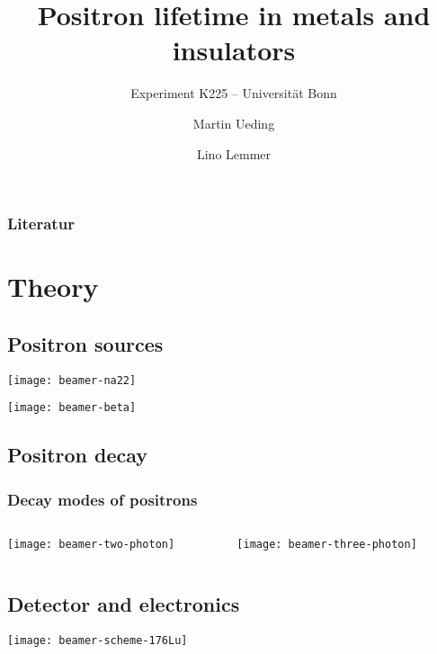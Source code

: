 \documentclass[english, fleqn]{beamer}
\title{Positron lifetime in metals and insulators}
\subtitle{Experiment K225 -- Universität Bonn}
\author{%
    Martin Ueding
    \and
    Lino Lemmer
}
\date{\daterange{2016-03-24}{2016-03-25}}
\begin{document}
\begin{frame}
    \titlepage
\end{frame}

\begin{frame}
    \frametitle{Literatur}

    \printbibliography
\end{frame}

\section{Theory}

\subsection{Positron sources}

\begin{frame}
\texttt{[image: beamer-na22]}
\end{frame}

\begin{frame}
\texttt{[image: beamer-beta]}
\end{frame}



\subsection{Positron decay}

\begin{frame}
    \frametitle{Decay modes of positrons}

    \begin{columns}[c]
        \begin{column}{.5\textwidth}
            \centering
            \texttt{[image: beamer-two-photon]}
        \end{column}
        \begin{column}{.5\textwidth}
            \centering
            \texttt{[image: beamer-three-photon]}
        \end{column}
    \end{columns}
\end{frame}



\subsection{Detector and electronics}

\texttt{[image: beamer-scheme-176Lu]}
\end{document}
